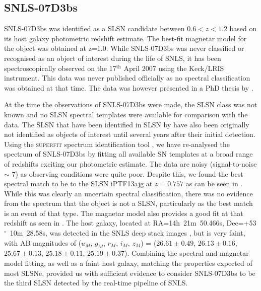 \subsection{SNLS-07D3bs}
\label{sec:07D3bs}
SNLS-07D3bs was identified as a SLSN candidate between $0.6<z<1.2$ based on its host galaxy photometric redshift estimate. The best-fit magnetar model for the object was obtained at z=1.0. While SNLS-07D3bs was never classified or recognised as an object of interest during the life of SNLS, it has been spectroscopically observed on the 17$^{\mathrm{th}}$ April 2007 using the Keck/LRIS instrument. This data was never published officially as no spectral classification was obtained at that time. The data was however presented in a PhD thesis by \citet{2013PhDT.......150F}.

At the time the observations of SNLS-07D3bs were made, the SLSN class was not known and no SLSN spectral templates were available for comparison with the data. The SLSN that have been identified in SLSN by \citet{Howell2013} have also been originally not identified as objects of interest until several years after their initial detection. Using the \textsc{superfit} spectrum identification tool \citep{Howell2005}, we have re-analysed the spectrum of SNLS-07D3bs by fitting all available SN templates at a broad range of redshifts exciting our photometric estimate. The data are noisy (signal-to-noise $\sim$ 7) as observing conditions were quite poor. Despite this, we found the best spectral match to be to the SLSN iPTF13ajg at $z=0.757$ as can be seen in . While this was clearly an uncertain spectral classification, there was no evidence from the spectrum that the object is not a SLSN, particularly as the best match is an event of that type. The magnetar model also provides a good fit at that redshift as seen in  . The host galaxy, located at RA=14h~21m~50.466s, Dec=+53$^{\circ}$~10m~28.58s, was detected in the SNLS deep stack images \citep{Ilbert2006}, but is very faint, with AB magnitudes of ($u_M$, $g_M$, $r_M$, $i_M$, $z_M$) = ($26.61\pm0.49$, $26.13\pm0.16$, $25.67\pm0.13$, $25.18\pm0.11$, $25.19\pm0.37$). Combining the spectral and magnetar model fitting, as well as a faint host galaxy, matching the properties expected of most SLSNe, provided us with sufficient evidence to consider SNLS-07D3bs to be the third SLSN detected by the real-time pipeline of SNLS.


